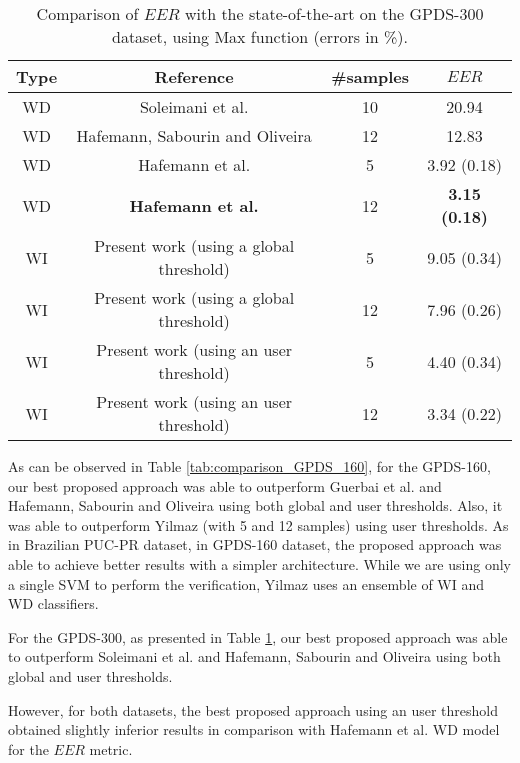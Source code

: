 \documentclass[conference]{IEEEtran}
\begin{document}
\begin{table}[!htb]
\caption{Comparison of $EER$ with the state-of-the-art on the GPDS-300 dataset, using Max function (errors in \%).}
\label{tab:comparison_GPDS_300}
\scriptsize
\centering

\begin{tabular}{cccc}
\hline
Type & Reference & \#samples & $EER$ \\ 
\hline
WD & Soleimani et al. \cite{soleimani:16} & 10  &  20.94 \\ 
WD & Hafemann, Sabourin and Oliveira \cite{hafemann:16} & 12  & 12.83 \\ 
WD & Hafemann et al. \cite{hafemann:17} & 5  &  3.92 (0.18) \\ 
WD & \textbf{Hafemann et al. \cite{hafemann:17}} & 12  &  \textbf{3.15 (0.18)} \\ 
WI & Present work (using a global threshold) & 5 & 9.05 (0.34) \\ 
WI & Present work (using a global threshold) & 12 & 7.96 (0.26) \\ 
WI & Present work (using an user threshold) & 5 & 4.40 (0.34) \\ 
WI & Present work (using an user threshold) & 12 & 3.34 (0.22) \\ 
\hline

\end{tabular}
\end{table}

As can be observed in Table \ref{tab:comparison_GPDS_160}, for the GPDS-160, our best proposed approach was able to outperform Guerbai et al. \cite{guerbai:15} and Hafemann, Sabourin and Oliveira \cite{hafemann:16} using both global and user thresholds. Also, it was able to outperform Yilmaz \cite{yilmaz:16} (with 5 and 12 samples) using user thresholds. 
As in Brazilian PUC-PR dataset, in GPDS-160 dataset, the proposed approach was able to achieve better results with a simpler architecture. While we are using only a single SVM to perform the verification, Yilmaz \cite{yilmaz:16} uses an ensemble of WI and WD classifiers.

For the GPDS-300, as presented in Table \ref{tab:comparison_GPDS_300}, our best proposed approach was able to outperform Soleimani et al. \cite{soleimani:16} and Hafemann, Sabourin and Oliveira \cite{hafemann:16} using both global and user thresholds. 

However, for both datasets, the best proposed approach using an user threshold obtained slightly inferior results in comparison with Hafemann et al. WD model \cite{hafemann:17} for the $EER$ metric. 
\end{document}
